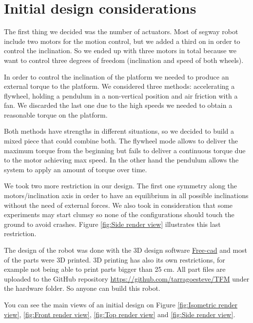 \section{Initial design considerations}
The first thing we decided was the number of actuators.
Most of segway robot include two motors for the motion control, but
we added a third on in order to control the inclination.
So we ended up with three motors in total because we want to control
three degrees of freedom (inclination and speed of both wheels).

In order to control the inclination of the platform we needed to produce
an external torque to the platform. We considered three methods: accelerating
a flywheel, holding a pendulum in a non-vertical position and air friction
with a fan. We discarded the last one due to the high speeds we needed to obtain
a reasonable torque on the platform.

Both methods have strengths in different situations, so we decided to build a mixed
piece that could combine both. The flywheel mode allows to deliver the maximum torque from
the beginning but fails to deliver a continuous torque due to the motor achieving max speed.
In the other hand the pendulum allows the system to apply an amount of torque over time.

We took two more restriction in our design. The first one symmetry along the motors/inclination
axis in order to have an equilibrium in all possible inclinations without the need of external forces.
We also took in consideration that some experiments may start clumsy so none of the configurations should
touch the ground to avoid crashes. Figure \ref{fig:Side render view} illustrates this last restriction.

The design of the robot was done with the 3D design software \href{https://www.freecadweb.org/}{Free-cad} and 
most of the parts were 3D printed. 3D printing has also its own restrictions, for example not being able to print
parts bigger than 25 cm. All part files are uploaded to the GitHub repository \url{https://github.com/tarragoesteve/TFM}
under the hardware folder. So anyone can build this robot.

You can see the main views of an initial design on Figure \ref{fig:Isometric render view},
\ref{fig:Front render view}, \ref{fig:Top render view} and \ref{fig:Side render view}.

